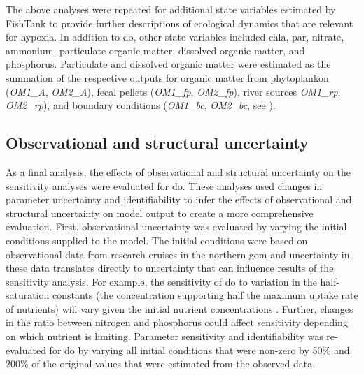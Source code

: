 \documentclass[letterpaper,12pt,oneside]{article}\usepackage[]{graphicx}\usepackage[]{color}
\begin{document}
The above analyses were repeated for additional state variables estimated by FishTank to provide further descriptions of ecological dynamics that are relevant for hypoxia.  In addition to \ac{do}, other state variables included \ac{chla}, \ac{par}, nitrate, ammonium, particulate organic matter, dissolved organic matter, and phosphorus.  Particulate and dissolved organic matter were estimated as the summation of the respective outputs for organic matter from phytoplankon (\textit{OM1\_A}, \textit{OM2\_A}), fecal pellets (\textit{OM1\_fp}, \textit{OM2\_fp}), river sources \textit{OM1\_rp}, \textit{OM2\_rp}), and boundary conditions (\textit{OM1\_bc}, \textit{OM2\_bc}, see ). 

\subsection{Observational and structural uncertainty}

As a final analysis, the effects of observational and structural uncertainty on the sensitivity analyses were evaluated for \ac{do}.  These analyses used changes in parameter uncertainty and identifiability to infer the effects of observational and structural uncertainty on model output to create a more comprehensive evaluation.  First, observational uncertainty was evaluated by varying the initial conditions supplied to the model.  The initial conditions were based on observational data from research cruises in the northern \ac{gom} \citep{Murrell14} and uncertainty in these data translates directly to uncertainty that can influence results of the sensitivity analysis.  For example, the sensitivity of \ac{do} to variation in the half-saturation constants (the concentration supporting half the maximum uptake rate of nutrients) will vary given the initial nutrient concentrations \citep{Eppley69}.  Further, changes in the ratio between nitrogen and phosphorus could affect sensitivity depending on which nutrient is limiting.  Parameter sensitivity and identifiability was re-evaluated for \ac{do} by varying all initial conditions that were non-zero by 50\% and 200\% of the original values that were estimated from the observed data.  
\end{document}

